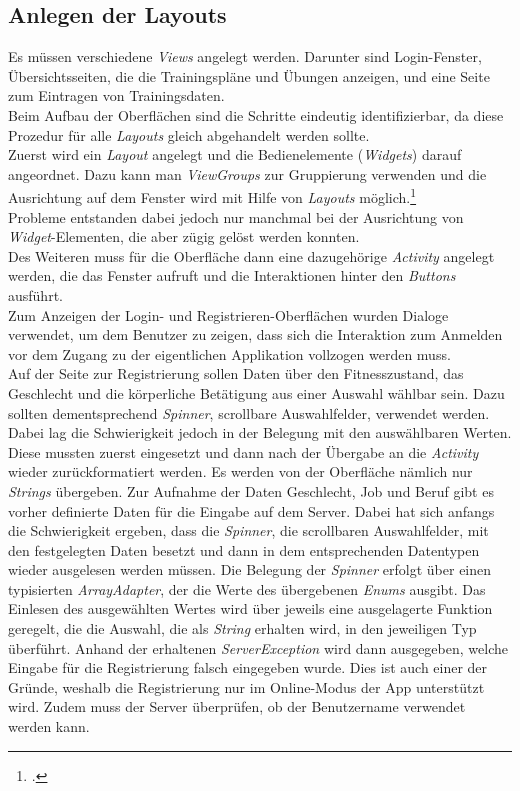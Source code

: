 \subsection{Anlegen der Layouts}
\label{ssec:nat-layouts}
Es müssen verschiedene \textit{Views} angelegt werden. Darunter sind Login-Fenster, Übersichtsseiten, die die Trainingspläne und Übungen anzeigen, und eine Seite zum Eintragen von Trainingsdaten.\\
Beim Aufbau der Oberflächen sind die Schritte eindeutig identifizierbar, da diese Prozedur für alle \textit{Layouts} gleich abgehandelt werden sollte.\\
Zuerst wird ein \textit{Layout} angelegt und die Bedienelemente (\textit{Widgets}) darauf angeordnet. Dazu kann man \textit{ViewGroups} zur Gruppierung verwenden und die Ausrichtung auf dem Fenster wird mit Hilfe von \textit{Layouts} möglich.\footcite[Vgl. S. 58ff.]{Android-BeckerPant}\\
Probleme entstanden dabei jedoch nur manchmal bei der Ausrichtung von \textit{Widget}-Elementen, die aber zügig gelöst werden konnten.\\
Des Weiteren muss für die Oberfläche dann eine dazugehörige \textit{Activity} angelegt werden, die das Fenster aufruft und die Interaktionen hinter den \textit{Buttons} ausführt.\\
Zum Anzeigen der Login- und Registrieren-Oberflächen wurden Dialoge verwendet, um dem Benutzer zu zeigen, dass sich die Interaktion zum Anmelden vor dem Zugang zu der eigentlichen Applikation vollzogen werden muss.\\
Auf der Seite zur Registrierung sollen Daten über den Fitnesszustand, das Geschlecht und die körperliche Betätigung aus einer Auswahl wählbar sein. Dazu sollten dementsprechend \textit{Spinner}, scrollbare Auswahlfelder, verwendet werden. Dabei lag die Schwierigkeit jedoch in der Belegung mit den auswählbaren Werten. Diese mussten zuerst eingesetzt und dann nach der Übergabe an die \textit{Activity} wieder zurückformatiert werden. Es werden von der Oberfläche nämlich nur \textit{Strings} übergeben. 
Zur Aufnahme der Daten Geschlecht, Job und Beruf gibt es vorher definierte Daten für die Eingabe auf dem Server. Dabei hat sich anfangs die Schwierigkeit ergeben, dass die \textit{Spinner}, die scrollbaren Auswahlfelder, mit den festgelegten Daten besetzt und dann in dem entsprechenden Datentypen wieder ausgelesen werden müssen. Die Belegung der \textit{Spinner} erfolgt über einen typisierten \textit{ArrayAdapter}, der die Werte des übergebenen \textit{Enums} ausgibt. Das Einlesen des ausgewählten Wertes wird über jeweils eine ausgelagerte Funktion geregelt, die die Auswahl, die als \textit{String} erhalten wird, in den jeweiligen Typ überführt. Anhand der erhaltenen \textit{ServerException} wird dann ausgegeben, welche Eingabe für die Registrierung falsch eingegeben wurde. Dies ist auch einer der Gründe, weshalb die Registrierung nur im Online-Modus der App unterstützt wird. Zudem muss der Server überprüfen, ob der Benutzername verwendet werden kann.\\
